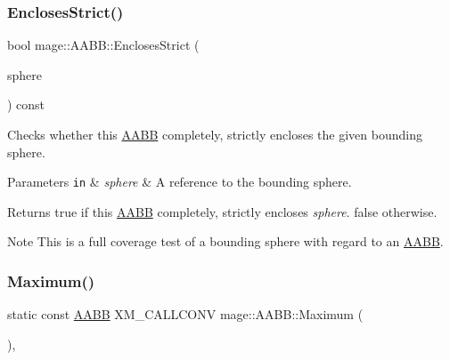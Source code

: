 \subsubsection{\texorpdfstring{Encloses\+Strict()}{EnclosesStrict()}\hspace{0.1cm}{\footnotesize\ttfamily [4/4]}}
{\footnotesize\ttfamily bool mage\+::\+A\+A\+B\+B\+::\+Encloses\+Strict (\begin{DoxyParamCaption}\item[{const \mbox{\hyperlink{classmage_1_1_bounding_sphere}{Bounding\+Sphere}} \&}]{sphere }\end{DoxyParamCaption}) const\hspace{0.3cm}{\ttfamily [noexcept]}}

Checks whether this \mbox{\hyperlink{classmage_1_1_a_a_b_b}{A\+A\+BB}} completely, strictly encloses the given bounding sphere.


\begin{DoxyParams}[1]{Parameters}
\mbox{\tt in}  & {\em sphere} & A reference to the bounding sphere. \\
\hline
\end{DoxyParams}
\begin{DoxyReturn}{Returns}
{\ttfamily true} if this \mbox{\hyperlink{classmage_1_1_a_a_b_b}{A\+A\+BB}} completely, strictly encloses {\itshape sphere}. {\ttfamily false} otherwise. 
\end{DoxyReturn}
\begin{DoxyNote}{Note}
This is a full coverage test of a bounding sphere with regard to an \mbox{\hyperlink{classmage_1_1_a_a_b_b}{A\+A\+BB}}. 
\end{DoxyNote}
\mbox{\label{classmage_1_1_a_a_b_b_a72f4f49b07a3816ad74fde9defc8cb76}} 
\subsubsection{\texorpdfstring{Maximum()}{Maximum()}}
{\footnotesize\ttfamily static const \mbox{\hyperlink{classmage_1_1_a_a_b_b}{A\+A\+BB}} X\+M\+\_\+\+C\+A\+L\+L\+C\+O\+NV mage\+::\+A\+A\+B\+B\+::\+Maximum (\begin{DoxyParamCaption}{ }\end{DoxyParamCaption})\hspace{0.3cm}{\ttfamily [static]}, {\ttfamily [noexcept]}}


